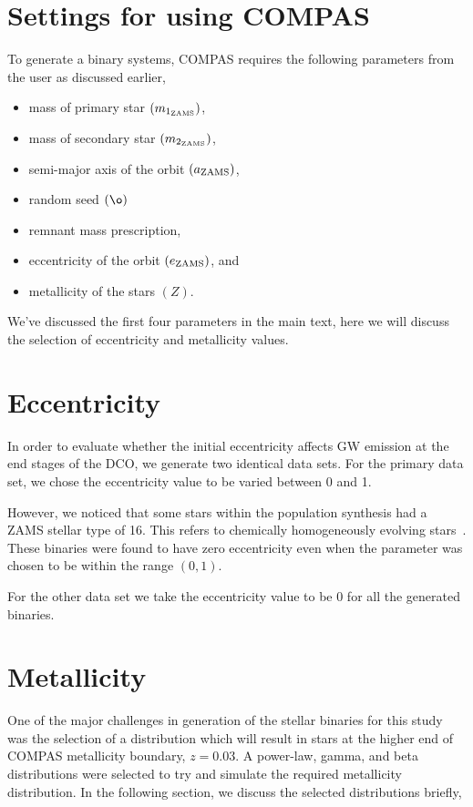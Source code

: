 \section{Settings for using COMPAS}
\label{sec:appA}
To generate a binary systems, COMPAS requires the following parameters from the user as discussed earlier,
\begin{itemize}
    \item mass of primary star $(m_{1_{\text{ZAMS}}})$,
    \item mass of secondary star $(m_{2_{\text{ZAMS}}})$,
    \item semi-major axis of the orbit $(a_{\text{ZAMS}})$,
    \item random seed $(\o)$
    \item remnant mass prescription,
    \item eccentricity of the orbit $(e_\text{ZAMS})$, and
    \item metallicity of the stars $\left(Z\right)$.
\end{itemize}

We've discussed the first four parameters in the main text, here we will discuss the selection of eccentricity and metallicity values.

\section*{Eccentricity}
\label{sec:eccentricity}

In order to evaluate whether the initial eccentricity affects GW emission at the end stages of the DCO, we generate two identical data sets.
For the primary data set, we chose the eccentricity value to be varied between 0 and 1.

However, we noticed that some stars within the population synthesis had a ZAMS stellar type of 16.
This refers to chemically homogeneously evolving stars~\cite{Riley2021, Riley2022}. 
These binaries were found to have zero eccentricity even when the parameter was chosen to be within the range $(0, 1)$.

For the other data set we take the eccentricity value to be 0 for all the generated binaries.

\section*{Metallicity}
\label{sec:metallicity}

One of the major challenges in generation of the stellar binaries for this study was the selection of a distribution which will result in stars at the higher end of COMPAS metallicity boundary, $z = 0.03$.
A power-law, gamma, and beta distributions were selected to try and simulate the required metallicity distribution.
In the following section, we discuss the selected distributions briefly,

